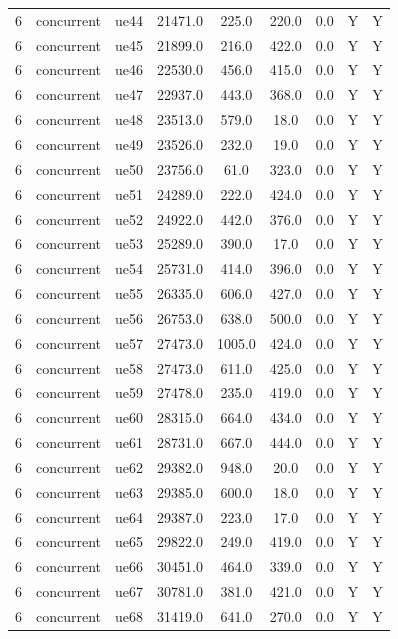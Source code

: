 \begin{table}[ht]
\begin{tabular}{|c|c|c|c|c|c|c|c|c|}
6 & concurrent & ue44 & 21471.0 & 225.0 & 220.0 & 0.0 & Y & Y \\
6 & concurrent & ue45 & 21899.0 & 216.0 & 422.0 & 0.0 & Y & Y \\
6 & concurrent & ue46 & 22530.0 & 456.0 & 415.0 & 0.0 & Y & Y \\
6 & concurrent & ue47 & 22937.0 & 443.0 & 368.0 & 0.0 & Y & Y \\
6 & concurrent & ue48 & 23513.0 & 579.0 & 18.0 & 0.0 & Y & Y \\
6 & concurrent & ue49 & 23526.0 & 232.0 & 19.0 & 0.0 & Y & Y \\
6 & concurrent & ue50 & 23756.0 & 61.0 & 323.0 & 0.0 & Y & Y \\
6 & concurrent & ue51 & 24289.0 & 222.0 & 424.0 & 0.0 & Y & Y \\
6 & concurrent & ue52 & 24922.0 & 442.0 & 376.0 & 0.0 & Y & Y \\
6 & concurrent & ue53 & 25289.0 & 390.0 & 17.0 & 0.0 & Y & Y \\
6 & concurrent & ue54 & 25731.0 & 414.0 & 396.0 & 0.0 & Y & Y \\
6 & concurrent & ue55 & 26335.0 & 606.0 & 427.0 & 0.0 & Y & Y \\
6 & concurrent & ue56 & 26753.0 & 638.0 & 500.0 & 0.0 & Y & Y \\
6 & concurrent & ue57 & 27473.0 & 1005.0 & 424.0 & 0.0 & Y & Y \\
6 & concurrent & ue58 & 27473.0 & 611.0 & 425.0 & 0.0 & Y & Y \\
6 & concurrent & ue59 & 27478.0 & 235.0 & 419.0 & 0.0 & Y & Y \\
6 & concurrent & ue60 & 28315.0 & 664.0 & 434.0 & 0.0 & Y & Y \\
6 & concurrent & ue61 & 28731.0 & 667.0 & 444.0 & 0.0 & Y & Y \\
6 & concurrent & ue62 & 29382.0 & 948.0 & 20.0 & 0.0 & Y & Y \\
6 & concurrent & ue63 & 29385.0 & 600.0 & 18.0 & 0.0 & Y & Y \\
6 & concurrent & ue64 & 29387.0 & 223.0 & 17.0 & 0.0 & Y & Y \\
6 & concurrent & ue65 & 29822.0 & 249.0 & 419.0 & 0.0 & Y & Y \\
6 & concurrent & ue66 & 30451.0 & 464.0 & 339.0 & 0.0 & Y & Y \\
6 & concurrent & ue67 & 30781.0 & 381.0 & 421.0 & 0.0 & Y & Y \\
6 & concurrent & ue68 & 31419.0 & 641.0 & 270.0 & 0.0 & Y & Y \\

\end{tabular}
\end{table}

